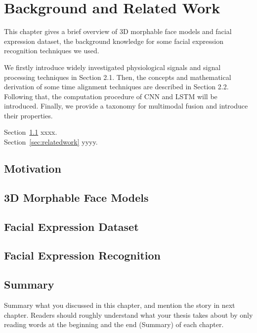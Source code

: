 \chapter{Background and Related Work}
\label{cha:background}

This chapter gives a brief overview of 3D morphable face models and facial expression dataset, the background
knowledge for some facial expression recognition techniques we used.


We firstly introduce widely investigated physiological signals and signal processing
techniques in Section 2.1. Then, the concepts and mathematical derivation of
some time alignment techniques are described in Section 2.2. Following that, the
computation procedure of CNN and LSTM will be introduced. Finally, we provide a
taxonomy for multimodal fusion and introduce their properties.


Section~\ref{sec:motivation} xxxx.\\


Section~\ref{sec:relatedwork} yyyy.\\


\section{Motivation}
\label{sec:motivation}


\section{3D Morphable Face Models}
\label{sec:3dmm}


\section{Facial Expression Dataset}
\label{sec:fed}

\section{Facial Expression Recognition}
\label{sec:fer}


\section{Summary}
Summary what you discussed in this chapter, and mention the story in next
chapter. Readers should roughly understand what your thesis takes about by only reading
words at the beginning and the end (Summary) of each chapter.



